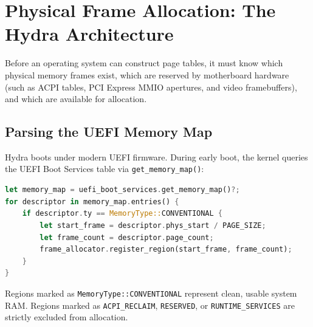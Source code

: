 \section{Physical Frame Allocation: The Hydra Architecture}
\label{sec:frame_alloc_deep}

Before an operating system can construct page tables, it must know which physical memory frames exist, which are reserved by motherboard hardware (such as ACPI tables, PCI Express MMIO apertures, and video framebuffers), and which are available for allocation.

\subsection{Parsing the UEFI Memory Map}
Hydra boots under modern UEFI firmware. During early boot, the kernel queries the UEFI Boot Services table via \texttt{get\_memory\_map()}:

\begin{lstlisting}[language=Rust, caption={Harvesting Conventional Memory from UEFI (\texttt{src/arch/boot\_services.rs})}]
let memory_map = uefi_boot_services.get_memory_map()?;
for descriptor in memory_map.entries() {
    if descriptor.ty == MemoryType::CONVENTIONAL {
        let start_frame = descriptor.phys_start / PAGE_SIZE;
        let frame_count = descriptor.page_count;
        frame_allocator.register_region(start_frame, frame_count);
    }
}
\end{lstlisting}

Regions marked as \texttt{MemoryType::CONVENTIONAL} represent clean, usable system RAM. Regions marked as \texttt{ACPI\_RECLAIM}, \texttt{RESERVED}, or \texttt{RUNTIME\_SERVICES} are strictly excluded from allocation.

